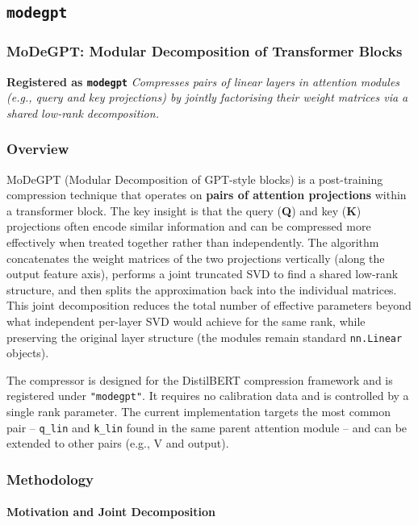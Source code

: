 \subsection{\texttt{modegpt}}
\subsubsection*{MoDeGPT: Modular Decomposition of Transformer Blocks}

\textbf{Registered as \texttt{modegpt}}
\textit{Compresses pairs of linear layers in attention modules (e.g., query and key projections) by jointly factorising their weight matrices via a shared low-rank decomposition.}


\subsubsection*{Overview}

MoDeGPT (Modular Decomposition of GPT-style blocks) is a post-training compression technique that operates on \textbf{pairs of attention projections} within a transformer block. The key insight is that the query (\textbf{Q}) and key (\textbf{K}) projections often encode similar information and can be compressed more effectively when treated together rather than independently. The algorithm concatenates the weight matrices of the two projections vertically (along the output feature axis), performs a joint truncated SVD to find a shared low-rank structure, and then splits the approximation back into the individual matrices. This joint decomposition reduces the total number of effective parameters beyond what independent per-layer SVD would achieve for the same rank, while preserving the original layer structure (the modules remain standard \texttt{nn.Linear} objects).

The compressor is designed for the DistilBERT compression framework and is registered under \texttt{"modegpt"}. It requires no calibration data and is controlled by a single rank parameter. The current implementation targets the most common pair -- \texttt{q\_lin} and \texttt{k\_lin} found in the same parent attention module -- and can be extended to other pairs (e.g., V and output).


\subsubsection*{Methodology}

\paragraph{Motivation and Joint Decomposition}

